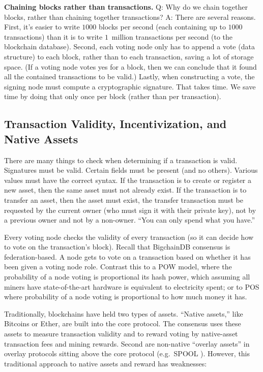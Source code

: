 \medskip
\noindent\textbf{Chaining blocks rather than transactions.} 
Q: Why do we chain together blocks, rather than chaining together transactions? 
A: There are several reasons.
First, it's easier to write $1000$ blocks per second (each containing up to $1000$ transactions) than it is to write $1$~million transactions per second (to the blockchain database).
Second, each voting node only has to append a vote (data structure) to each block, rather than to each transaction, saving a lot of storage space. (If a voting node votes yes for a block, then we can conclude that it found all the contained transactions to be valid.) Lastly, when constructing a vote, the signing node must compute a cryptographic signature. That takes time. We save time by doing that only once per block (rather than per transaction).


\subsection{Transaction Validity, Incentivization, and Native Assets}
There are many things to check when determining if a transaction is valid. Signatures must be valid. Certain fields must be present (and no others). Various values must have the correct syntax.
If the transaction is to create or register a new asset, then the same asset must not already exist.
If the transaction is to transfer an asset, then the asset must exist, the transfer transaction must be requested by the current owner (who must sign it with their private key), not by a previous owner and not by a non-owner. ``You can only spend what you have.''

Every voting node checks the validity of every transaction (so it can decide how to vote on the transaction's block). 
Recall that BigchainDB consensus is federation-based.
A node gets to vote on a transaction based on whether it has been given a voting node role.
Contrast this to a POW model, where the probability of a node voting is proportional its hash power, which assuming all miners have state-of-the-art hardware is equivalent to electricity spent; or to POS where probability of a node voting is proportional to how much money it has.

Traditionally, blockchains have held two types of assets. 
“Native assets,” like Bitcoins or Ether, are built into the core protocol. 
The consensus uses these assets to measure transaction validity and to reward voting by native-asset transaction fees and mining rewards. 
Second are non-native “overlay assets” in overlay protocols sitting above the core protocol (e.g.~SPOOL \cite{dejonghe_spool}).
However, this traditional approach to native assets and reward has weaknesses:


